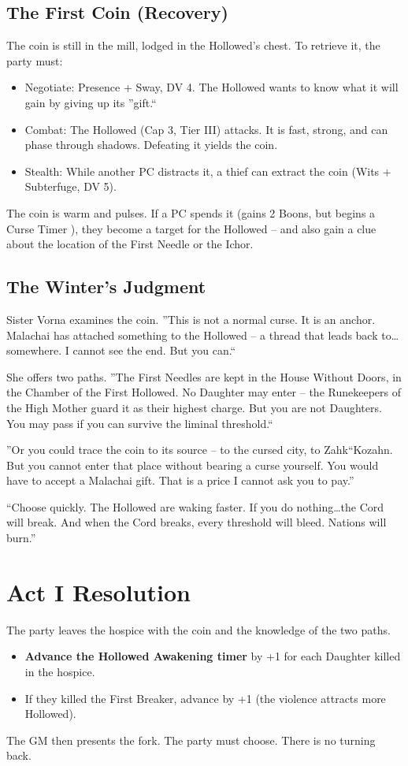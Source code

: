 \documentclass[10pt,twoside]{book}
\begin{document}
\subsection{The First Coin (Recovery)}
The coin is still in the mill, lodged in the Hollowed's chest. To retrieve it, the party must:
\begin{itemize}
\item Negotiate: Presence + Sway, DV 4. The Hollowed wants to know what it will gain by giving up its ''gift.``
\item Combat: The Hollowed (Cap 3, Tier III) attacks. It is fast, strong, and can phase through shadows. Defeating it yields the coin.
\item Stealth: While another PC distracts it, a thief can extract the coin (Wits + Subterfuge, DV 5).
\end{itemize}
The coin is warm and pulses. If a PC spends it (gains 2 Boons, but begins a Curse Timer ), they become a target for the Hollowed -- and also gain a clue about the location of the First Needle or the Ichor.

\subsection{The Winter's Judgment}
Sister Vorna examines the coin. ''This is not a normal curse. It is an anchor. Malachai has attached something to the Hollowed -- a thread that leads back to\dots somewhere. I cannot see the end. But you can.``

She offers two paths. ''The First Needles are kept in the House Without Doors, in the Chamber of the First Hollowed. No Daughter may enter -- the Runekeepers of the High Mother guard it as their highest charge. But you are not Daughters. You may pass if you can survive the liminal threshold.``

''Or you could trace the coin to its source -- to the cursed city, to Zahk``Kozahn. But you cannot enter that place without bearing a curse yourself. You would have to accept a Malachai gift. That is a price I cannot ask you to pay.''

``Choose quickly. The Hollowed are waking faster. If you do nothing\dots the Cord will break. And when the Cord breaks, every threshold will bleed. Nations will burn.''

\section{Act I Resolution}
The party leaves the hospice with the coin and the knowledge of the two paths.
\begin{itemize}
\item \textbf{Advance the Hollowed Awakening timer} by +1 for each Daughter killed in the hospice.
\item If they killed the First Breaker, advance by +1 (the violence attracts more Hollowed).
\end{itemize}
The GM then presents the fork. The party must choose. There is no turning back.
\end{document}
